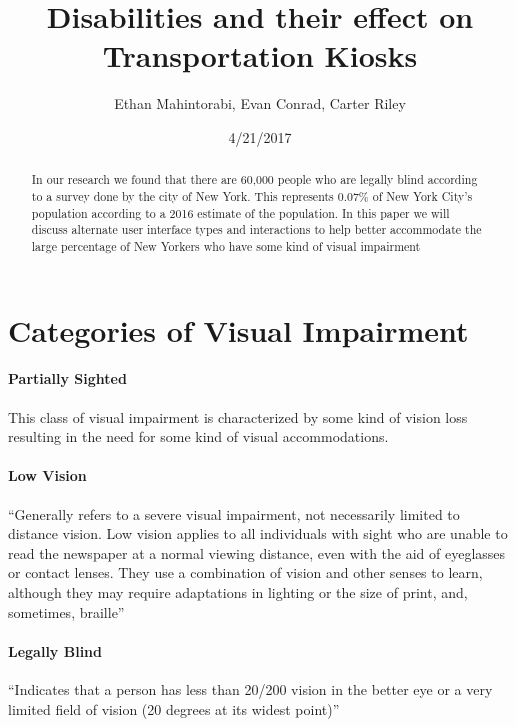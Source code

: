 \documentclass{article}
\author{Ethan Mahintorabi, Evan Conrad, Carter Riley}
\date{4/21/2017}
\title{Disabilities and their effect on Transportation Kiosks}
\begin{document}
    \maketitle

    \begin{abstract}
        In our research we found that there are 60,000 people who are legally
        blind according to a survey done by the city of New York\cite{BLIND}. This
        represents 0.07\% of New York City's population according to a 2016 estimate of
        the population\cite{CENCUS_ESTIMATE}. In this paper we will discuss alternate
        user interface types and interactions to help better accommodate the large percentage
        of New Yorkers who have some kind of visual impairment
    \end{abstract}

    \section{Categories of Visual Impairment}
        \paragraph{Partially Sighted}
                This class of visual impairment is characterized by some kind of vision
            loss resulting in the need for some kind of visual accommodations.\cite{VISAUL_IMPAIRMENT_DEF}
        \paragraph{Low Vision}
            ``Generally refers to a severe visual impairment,
            not necessarily limited to distance vision. Low vision
            applies to all individuals with sight who are unable
            to read the newspaper at a normal viewing distance,
            even with the aid of eyeglasses or contact lenses. They
            use a combination of vision and other senses to learn,
            although they may require adaptations in lighting or
            the size of print, and, sometimes, braille''\cite{VISAUL_IMPAIRMENT_DEF}
        \paragraph{Legally Blind}
            ``Indicates that a person has less than
            20/200 vision in the better eye or a very limited field of
            vision (20 degrees at its widest point)''\cite{VISAUL_IMPAIRMENT_DEF}
\end{document}

